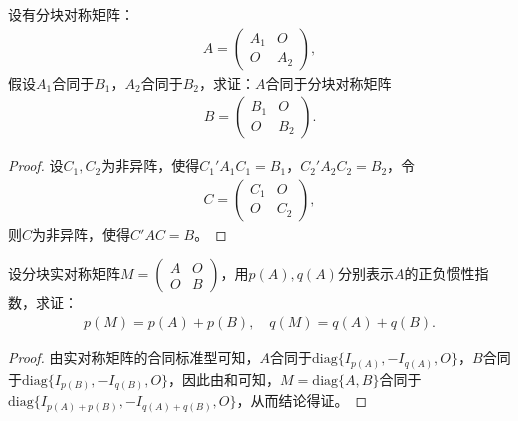 \documentclass[../../main.tex]{subfiles}
\begin{document}
\begin{proposition}\label{proposition:分块准对角阵合同于每个块的合同阵}
设有分块对称矩阵：
\begin{align*}
A = \begin{pmatrix}
A_1 & O \\
O & A_2
\end{pmatrix},
\end{align*}
假设\(A_1\)合同于\(B_1\)，\(A_2\)合同于\(B_2\)，求证：\(A\)合同于分块对称矩阵
\begin{align*}
B = \begin{pmatrix}
B_1 & O \\
O & B_2
\end{pmatrix}.
\end{align*}
\end{proposition} 
\begin{proof}
设\(C_1,C_2\)为非异阵，使得\(C_1'A_1C_1 = B_1\)，\(C_2'A_2C_2 = B_2\)，令
\begin{align*}
C = \begin{pmatrix}
C_1 & O \\
O & C_2
\end{pmatrix},
\end{align*}
则\(C\)为非异阵，使得\(C'AC = B\)。

\end{proof}

\begin{proposition}\label{proposition:分块准对角阵的正负惯性指数}
设分块实对称矩阵\(M = \begin{pmatrix}
A & O \\
O & B
\end{pmatrix}\)，用\(p(A),q(A)\)分别表示\(A\)的正负惯性指数，求证：
\begin{align*}
p(M)=p(A)+p(B),\quad q(M)=q(A)+q(B).
\end{align*}
\end{proposition} 
\begin{proof}
由实对称矩阵的合同标准型可知，\(A\)合同于\(\mathrm{diag}\{I_{p(A)}, -I_{q(A)},O\}\)，\(B\)合同于\(\mathrm{diag}\{I_{p(B)}, -I_{q(B)},O\}\)，因此由和可知，\(M = \mathrm{diag}\{A,B\}\)合同于\(\mathrm{diag}\{I_{p(A)+p(B)}, -I_{q(A)+q(B)},O\}\)，从而结论得证。

\end{proof}
\end{document}
